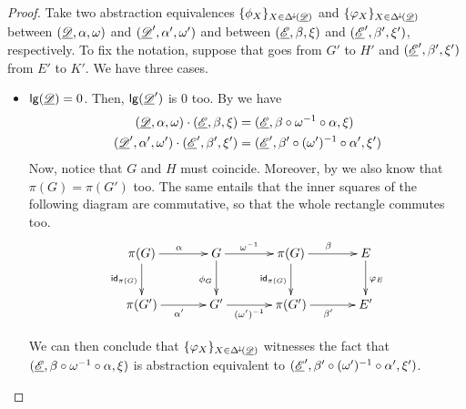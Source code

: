 \begin{proof} Take two abstraction equivalences $\{\phi_X\}_{X\in \Delta^{\hspace{-1pt}\downarrow\hspace{-1pt}}(\underline{\mathscr{D}})}$ and $\{\varphi_X\}_{X\in \Delta^{\hspace{-1pt}\downarrow\hspace{-1pt}}(\underline{\mathscr{D}})}$ between $(\underline{\mathscr{D}}, \alpha, \omega)$ and $(\underline{\mathscr{D}}', \alpha', \omega')$ and between $(\underline{\mathscr{E}}, \beta, \xi)$ and $(\underline{\mathscr{E}}', \beta', \xi')$, respectively. To fix the notation, suppose that goes from $G'$ to $H'$ and $(\underline{\mathscr{E}}', \beta', \xi')$ from $E'$ to $K'$. We have three cases.
	
	\begin{itemize}
		\item $\mathsf{lg}(\underline{\mathscr{D}})=0$. Then, $\mathsf{lg}(\underline{\mathscr{D}}')$ is $0$ too. By  we have
		\begin{align*}
			(\underline{\mathscr{D}}, \alpha, \omega)\cdot (\underline{\mathscr{E}}, \beta, \xi)&=(\underline{\mathscr{E}}, \beta\circ \omega^{-1}\circ \alpha, \xi)\\
			(\underline{\mathscr{D}}', \alpha', \omega')\cdot (\underline{\mathscr{E}}', \beta', \xi')&=(\underline{\mathscr{E}}', \beta'\circ (\omega')^{-1}\circ \alpha', \xi')
		\end{align*}
		Now, notice that $G$ and $H$ must coincide. Moreover, by  we also know that $\pi(G)=\pi(G')$ too. The same  entails that the inner squares of the following diagram are commutative, so that the whole rectangle commutes too.
		\[\xymatrix@C=35pt{\pi(G) \ar[r]^{\alpha} \ar[d]_{\id{\pi(G)}}& G  \ar[d]_{\phi_G}\ar[r]^-{\omega^{-1}} & \pi(G) \ar[d]_{\id{\pi(G)}} \ar[r]^{\beta}& E \ar[d]^{\varphi_E}\\\pi(G') \ar[r]_{\alpha'}& G' \ar[r]_-{(\omega')^{-1}} & \pi(G') \ar[r]_{\beta'} & E'}\]
		
		We can  then conclude that $\{\varphi_X\}_{X\in \Delta^{\hspace{-1pt}\downarrow\hspace{-1pt}}(\underline{\mathscr{D}})}$ witnesses the fact that $(\underline{\mathscr{E}}, \beta\circ \omega^{-1}\circ \alpha, \xi)$ is abstraction equivalent to $(\underline{\mathscr{E}}', \beta'\circ (\omega')^{-1}\circ \alpha', \xi')$.
		

\end{itemize}
\end{proof}

